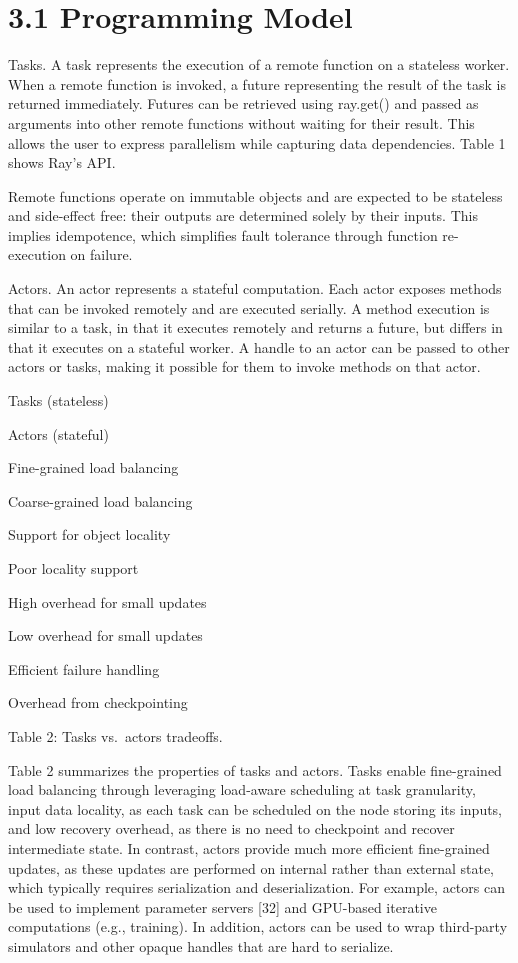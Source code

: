 \documentclass[
]{article}
\begin{document}
\section{3.1 Programming Model}\label{programming-model}

Tasks. A task represents the execution of a remote function on a
stateless worker. When a remote function is invoked, a future
representing the result of the task is returned immediately. Futures can
be retrieved using ray.get() and passed as arguments into other remote
functions without waiting for their result. This allows the user to
express parallelism while capturing data dependencies. Table 1 shows
Ray's API.

Remote functions operate on immutable objects and are expected to be
stateless and side-effect free: their outputs are determined solely by
their inputs. This implies idempotence, which simplifies fault tolerance
through function re-execution on failure.

Actors. An actor represents a stateful computation. Each actor exposes
methods that can be invoked remotely and are executed serially. A method
execution is similar to a task, in that it executes remotely and returns
a future, but differs in that it executes on a stateful worker. A handle
to an actor can be passed to other actors or tasks, making it possible
for them to invoke methods on that actor.

Tasks (stateless)

Actors (stateful)

Fine-grained load balancing

Coarse-grained load balancing

Support for object locality

Poor locality support

High overhead for small updates

Low overhead for small updates

Efficient failure handling

Overhead from checkpointing

Table 2: Tasks vs.~actors tradeoffs.

Table 2 summarizes the properties of tasks and actors. Tasks enable
fine-grained load balancing through leveraging load-aware scheduling at
task granularity, input data locality, as each task can be scheduled on
the node storing its inputs, and low recovery overhead, as there is no
need to checkpoint and recover intermediate state. In contrast, actors
provide much more efficient fine-grained updates, as these updates are
performed on internal rather than external state, which typically
requires serialization and deserialization. For example, actors can be
used to implement parameter servers {[}32{]} and GPU-based iterative
computations (e.g., training). In addition, actors can be used to wrap
third-party simulators and other opaque handles that are hard to
serialize.
\end{document}
